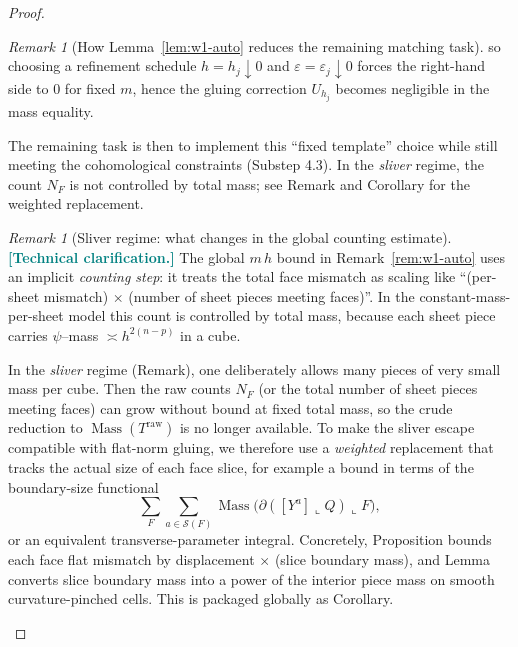 \documentclass[11pt]{article}
\newcommand{\REVMZ}[1]{\textcolor{teal}{#1}}  %
\numberwithin{equation}{section}  %
\theoremstyle{plain}
\theoremstyle{definition}
\theoremstyle{remark}
\newtheorem{remark}[theorem]{Remark}
\DeclareMathOperator{\Mass}{Mass}
\begin{document}
\begin{proof}
\begin{remark}[How Lemma~\ref{lem:w1-auto} reduces the remaining matching task]
so choosing a refinement schedule $h=h_j\downarrow 0$ and $\varepsilon=\varepsilon_j\downarrow 0$ forces the right-hand side to $0$ for fixed $m$, hence the gluing correction $U_{h_j}$ becomes negligible in the mass equality.

The remaining task is then to implement this ``fixed template'' choice while still meeting the cohomological constraints (Substep 4.3).
\smallskip
In the \emph{sliver} regime, the count $N_F$ is not controlled by total mass; see Remark and
Corollary for the weighted replacement.
\end{remark}


\begin{remark}[Sliver regime: what changes in the global counting estimate]\label{rem:sliver-vs-template}
\REVMZ{\textbf{[Technical clarification.]}}
The global $m\,h$ bound in Remark~\ref{rem:w1-auto} uses an implicit \emph{counting step}: it treats the total face mismatch as scaling like
``(per-sheet mismatch) $\times$ (number of sheet pieces meeting faces)''.  In the constant-mass-per-sheet model this count is controlled by total mass,
because each sheet piece carries $\psi$--mass $\asymp h^{2(n-p)}$ in a cube.

\smallskip\noindent
In the \emph{sliver} regime (Remark), one deliberately allows many pieces of very small mass per cube.
Then the raw counts $N_F$ (or the total number of sheet pieces meeting faces) can grow without bound at fixed total mass, so the crude reduction
to $\Mass(T^{\mathrm{raw}})$ is no longer available.
To make the sliver escape compatible with flat-norm gluing, we therefore use a \emph{weighted} replacement that tracks the actual size of each face slice,
for example a bound in terms of the boundary-size functional
\[
\sum_{F}\sum_{a\in\mathcal S(F)} \Mass\!\big(\partial([Y^a]\llcorner Q)\llcorner F\big),
\]
or an equivalent transverse-parameter integral.  Concretely, Proposition bounds each face flat mismatch by
displacement $\times$ (slice boundary mass), and Lemma converts slice boundary mass into a power of the
interior piece mass on smooth curvature-pinched cells.  This is packaged globally as Corollary.
\end{remark}



\end{proof}
\end{document}
